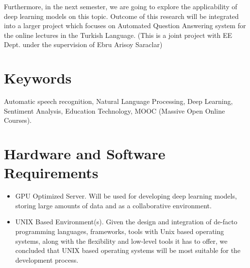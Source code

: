 \documentclass[10pt]{article}
\begin{document}
	Furthermore, in the next semester, we are going to explore the applicability of deep learning models on this topic. Outcome of this research will be integrated into a larger project which focuses on Automated Question Answering system for the online lectures in the Turkish Language. (This is a joint project with EE Dept. under the supervision of Ebru Arisoy Saraclar)
	
	\section{Keywords}
	
	Automatic speech recognition, Natural Language Processing, Deep Learning, Sentiment Analysis, Education Technology, MOOC (Massive Open Online Courses). \newline \par
	
	\section{Hardware and Software Requirements}
	
	\begin{itemize}[label=\textcolor{darkazure}{\Large\textbullet}]
		\item GPU Optimized Server. Will be used for developing deep learning models, storing large amounts of data and as a collaborative environment.
		
		\item UNIX Based Environment(s). Given the design and integration of de-facto programming languages, frameworks, tools with Unix based operating systems, along with the flexibility and low-level tools it has to offer, we concluded that UNIX based operating systems will be most suitable for the development process.
	\end{itemize}
	
	
\end{document}
